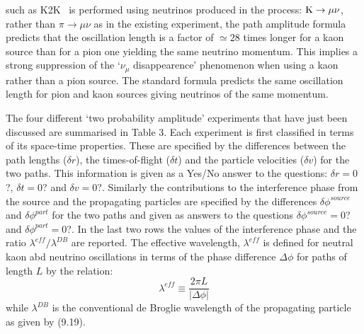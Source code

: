 { such as K2K~\cite{K2K} is performed using neutrinos produced in the process: ${\rm K} \rightarrow \mu \nu$, rather 
  than $\pi \rightarrow \mu \nu$ as in the existing experiment, the path amplitude formula predicts
   that the oscillation length is a factor of $\simeq 28$ times longer for a kaon source than
   for a pion one yielding the same neutrino momentum. This implies a strong suppression
  of the `$\nu_{\mu}$ disappearence' phenomenon when using a kaon rather than a pion source. The
   standard formula predicts the same oscillation length for pion and kaon sources giving
  neutrinos of the same momentum.
   \par The four different `two probability amplitude' experiments that have just been discussed
 are summarised in Table 3. Each experiment is first classified in terms of its space-time properties.
 These are specified by the differences between the path lengths ($\delta r$), the
 times-of-flight ($\delta t$) and the particle velocities ($\delta v$) for the two paths. This information is
 given as a Yes/No answer to the questions:  $\delta r = 0$?,  $\delta t = 0$? and  $\delta v = 0$?.
 Similarly the contributions to the interference phase from the source and the propagating
 particles are specified by the differences $\delta \phi^{source}$ and $\delta \phi^{part}$ for the two paths
 and given as answers to the questions $\delta \phi^{source} = 0$? and  $\delta \phi^{part} = 0$?.
 In the last two rows the values of the interference phase and the ratio $\lambda^{eff}/\lambda^{DB}$
 are reported.  The effective wavelength, $\lambda^{eff}$ is defined for neutral kaon 
  abd neutrino oscillations in terms of the
  phase difference $\Delta \phi$ for paths of length $L$ by the relation:
 \begin{equation}
  \lambda^{eff} \equiv \frac{2 \pi L}{|\Delta \phi|} 
 \end{equation}
 while $\lambda^{DB}$ is the conventional de Broglie wavelength of the propagating particle as given by
 (9.19).
   
}
